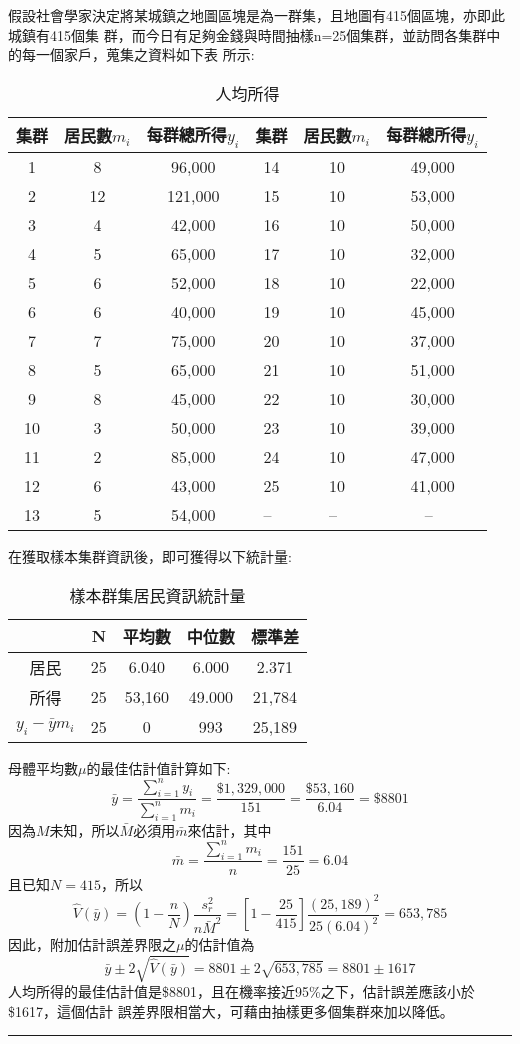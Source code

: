 		\begin{ex}\label{ex:cluster}
			假設社會學家決定將某城鎮之地圖區塊是為一群集，且地圖有415個區塊，亦即此城鎮有415個集				群，而今日有足夠金錢與時間抽樣n=25個集群，並訪問各集群中的每一個家戶，蒐集之資料如下表				所示:
			\begin{table}[h]
			\centering
			\caption{人均所得}
				\begin{tabular}{ccc|ccc}
				\hline
				集群&居民數$m_i$&每群總所得$y_i$&集群&居民數$m_i$&每群總所得$y_i$ \\ \hline
				1&8&96,000&14&10&49,000\\
				2&12&121,000&15&10&53,000\\
				3&4&42,000&16&10&50,000\\
				4&5&65,000&17&10&32,000\\
				5&6&52,000&18&10&22,000\\
				6&6&40,000&19&10&45,000\\
				7&7&75,000&20&10&37,000\\
				8&5&65,000&21&10&51,000\\
				9&8&45,000&22&10&30,000\\
				10&3&50,000&23&10&39,000\\
				11&2&85,000&24&10&47,000\\
				12&6&43,000&25&10&41,000\\
				13&5&54,000&--~&--~&--~\\
				\hline				
				\end{tabular}
			\end{table}
			在獲取樣本集群資訊後，即可獲得以下統計量:
			\begin{table}[h]
			\centering
			\caption{樣本群集居民資訊統計量}
				\begin{tabular}{ccccc}
					\hline \rowcolor{blizzardblue}
					&N&平均數&中位數&標準差\\ \hline \rowcolor{blanchedalmond}
					居民&25&6.040&6.000&2.371\\ \rowcolor{blanchedalmond}
					所得&25&53,160&49.000&21,784\\ \rowcolor{blanchedalmond}
					$ y_i-\bar{y} m_i $&25&0&993&25,189\\ 
					\hline
				\end{tabular}
			\end{table}
			母體平均數$\mu$的最佳估計值計算如下:
			$$ \bar{y} = \frac{\sum^n_{i=1} y_i}{\sum^n_{i=1} m_i} 
			=\frac{\$1,329,000}{151} = \frac{\$53,160}{6.04}=\$8801 $$
			因為$M$未知，所以$\bar{M}$必須用$\bar{m}$來估計，其中
			$$\bar{m}=\frac{\sum^n_{i=1} m_i}{n} = \frac{151}{25} = 6.04$$
			且已知$N=415$，所以
			$$ \hat{V}(\bar{y})=\left( 1-\frac{n}{N} \right)\frac{s^2_r}{n\bar{M}^2}=				\left[ 1-\frac{25}{415} \right] \frac{(25,189)^2}{25(6.04)^2}=653,785 $$	
			因此，附加估計誤差界限之$\mu$的估計值為
			$$ \bar{y}\pm 2\sqrt{\hat{V}(\bar{y})}=8801\pm 2\sqrt{653,785}=8801\pm1617  			$$
			人均所得的最佳估計值是\$8801，且在機率接近95\%之下，估計誤差應該小於\$1617，這個估計				誤差界限相當大，可藉由抽樣更多個集群來加以降低。
		\end{ex}
		\rule{\textwidth}{0.2pt}
